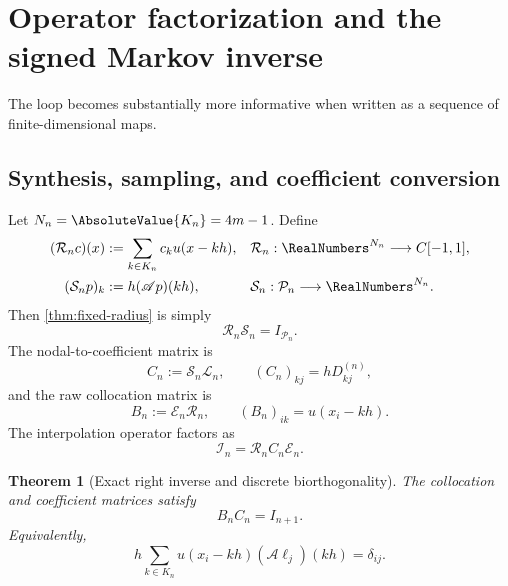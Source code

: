 \documentclass[11pt,oneside]{article}
\numberwithin{equation}{section}
\newtheorem{theorem}{Theorem}[section]
\theoremstyle{definition}
\theoremstyle{remark}
\newcommand{\PiN}{\mathcal P}
\newcommand{\App}{\mathscr A}
\newcommand{\Lag}{\mathcal I}
\newcommand{\Eval}{\mathcal E}
\newcommand{\Rec}{\mathcal L}
\newcommand{\Synth}{\mathcal R}
\newcommand{\Coeff}{\mathcal S}
\begin{document}
\section{Operator factorization and the signed Markov inverse}
\label{sec:operators}

The loop becomes substantially more informative when written as a sequence
of finite-dimensional maps.

\subsection{Synthesis, sampling, and coefficient conversion}

Let $N_n=\AbsoluteValue{K_n}=4m-1$.  Define
\begin{align}
 (\Synth_nc)(x)&:=\sum_{k\in K_n}c_k u(x-kh),
 &&\Synth_n:\RealNumbers^{N_n}\longrightarrow C[-1,1],
 \label{eq:R-def}\\
 (\Coeff_np)_k&:=h(\App p)(kh),
 &&\Coeff_n:\PiN_n\longrightarrow\RealNumbers^{N_n}.
 \label{eq:S-def}
\end{align}
Then \cref{thm:fixed-radius} is simply
\begin{equation}
 \Synth_n\Coeff_n=I_{\PiN_n}.
 \label{eq:RS-identity}
\end{equation}
The nodal-to-coefficient matrix is
\begin{equation}
 C_n:=\Coeff_n\Rec_n,
 \qquad (C_n)_{kj}=hD_{kj}^{(n)},
 \label{eq:C-def}
\end{equation}
and the raw collocation matrix is
\begin{equation}
 B_n:=\Eval_n\Synth_n,
 \qquad (B_n)_{ik}=u(x_i-kh).
 \label{eq:B-def}
\end{equation}
The interpolation operator factors as
\begin{equation}
 \boxed{
 \Lag_n=\Synth_nC_n\Eval_n.
 }
 \label{eq:interpolation-factorization}
\end{equation}

\begin{theorem}[Exact right inverse and discrete biorthogonality]
\label{thm:right-inverse}
The collocation and coefficient matrices satisfy
\begin{equation}
 \boxed{B_nC_n=I_{n+1}.}
 \label{eq:BC}
\end{equation}
Equivalently,
\begin{equation}
 h\sum_{k\in K_n}u(x_i-kh)(\App\ell_j)(kh)=\delta_{ij}.
 \label{eq:biorthogonality}
\end{equation}
\end{theorem}
\end{document}
